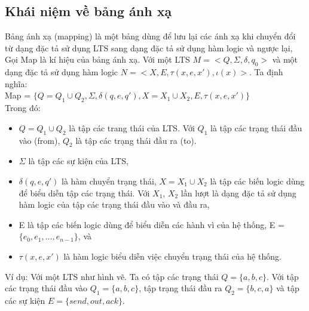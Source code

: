 \documentclass[a4paper,13pt,oneside,openany]{book}
\begin{document}
\begin{flushleft}
			\subsection{Khái niệm về bảng ánh xạ}
				Bảng ánh xạ (mapping) là một bảng dùng để lưu lại các ánh xạ khi chuyển đổi từ dạng đặc tả sử dụng LTS sang dạng đặc tả sử dụng hàm logic và ngược lại,\\
				Gọi Map là kí hiệu của bảng ánh xạ. Với một LTS $M = <Q, \Sigma, \delta, q_{0}>$ và một dạng đặc tả sử dụng hàm logic $N = <X, E, \tau(x, e, x'), \iota(x)>$. Ta định nghĩa:\\
				Map = $\{Q = Q_1 \cup Q_2, \Sigma, \delta(q, e, q'), X = X_1 \cup X_2, E, \tau(x, e, x')\}$\\
				Trong đó:\\
				\begin{itemize}
					\item $Q = Q_1 \cup Q_2$ là tập các trang thái của LTS. Với $Q_1$ là tập các trạng thái đầu vào (from), $Q_2$ là tập các trạng thái đầu ra (to).\\
					\item $\Sigma$ là tập các sự kiện của LTS,
					\item $\delta(q, e, q')$ là hàm chuyển trạng thái, $X = X_1 \cup X_2$ là tập các biến logic dùng để biểu diễn tập các trạng thái. Với $X_1$, $X_2$ lần lượt là dạng đặc tả sử dụng hàm logic của tập các trạng thái đầu vào và đầu ra,
					\item E là tập các biến logic dùng để biểu diễn các hành vì của hệ thống, E = $\{e_0, e_1, ..., e_{n-1}\}$, và
					\item $\tau(x, e, x')$ là hàm logic biểu diễn việc chuyển trạng thái của hệ thống.\\
				\end{itemize}
				Ví dụ: Với một LTS như hình vẽ. Ta có tập các trạng thái $Q = \{a, b, c\}$. Với tập các trạng thái đầu vào $Q_{1} = \{a, b, c\}$, tập trạng thái đầu ra $Q_{2} = \{b, c, a\}$ và tập các sự kiện $E = \{send, out, ack\}$.\\
			

\end{flushleft}
\end{document}
